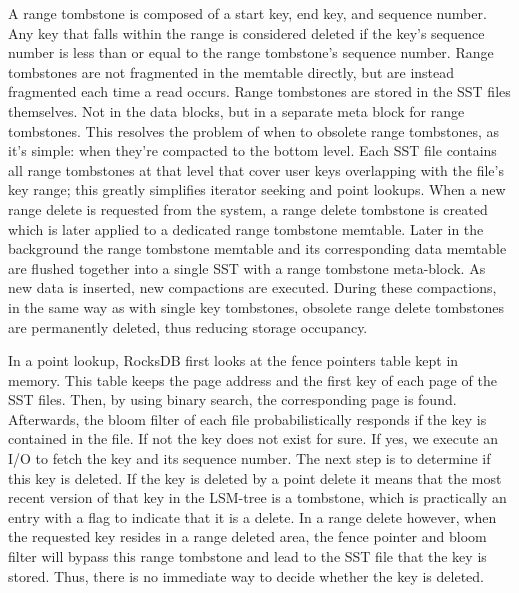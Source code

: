 A range tombstone is composed of a start key, end key, and sequence number. 
Any key that falls within the range is considered deleted if the key's sequence number is less than or equal to the range tombstone's sequence number. 
Range tombstones are not fragmented in the memtable directly, but are instead fragmented each time a read occurs.
Range tombstones are stored in the SST files themselves. Not in the data blocks, but in a separate meta block for range tombstones. 
This resolves the problem of when to obsolete range tombstones, as it's simple: when they're compacted to the bottom level. 
Each SST file contains all range tombstones at that level that cover user keys overlapping with the file's key range; this greatly simplifies iterator seeking and point lookups. 
When a new range delete is requested from the system, a range delete tombstone is created which is later applied to a dedicated range tombstone memtable. 
Later in the background the range tombstone memtable and its corresponding data memtable are flushed together into a single SST with a range tombstone meta-block. 
As new data is inserted, new compactions are executed. 
During these compactions, in the same way as with single key tombstones, obsolete range delete tombstones are permanently deleted, thus reducing storage occupancy. 

In a point lookup, RocksDB first looks at the fence pointers table kept in memory. 
This table keeps the page address and the first key of each page of the SST files. 
Then, by using binary search, the corresponding page is found. 
Afterwards, the bloom filter of each file probabilistically responds if the key is contained in the file. If not the key does not exist for sure. 
If yes, we execute an I/O to fetch the key and its sequence number. The next step is to determine if this key is deleted. 
If the key is deleted by a point delete it means that the most recent version of that key in the LSM-tree is a tombstone, which is practically an entry with a flag to indicate that it is a delete. 
In a range delete however, when the requested key resides in a range deleted area, the fence pointer and bloom filter will bypass this range tombstone and lead to the SST file that the key is stored. 
Thus, there is no immediate way to decide whether the key is deleted.

